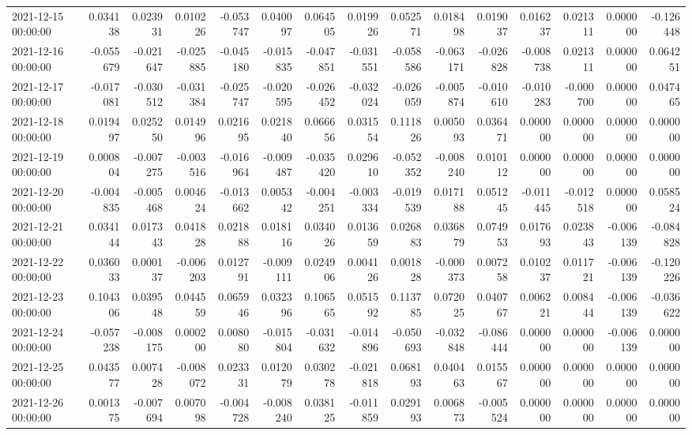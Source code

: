 \begin{tabular}{lrrrrrrrrrrrrrr}
2021-12-15 00:00:00 & 0.034138 & 0.023931 & 0.010226 & -0.053747 & 0.040097 & 0.064505 & 0.019926 & 0.052571 & 0.018498 & 0.019037 & 0.016237 & 0.021311 & 0.000000 & -0.126448 \\
2021-12-16 00:00:00 & -0.055679 & -0.021647 & -0.025885 & -0.045180 & -0.015835 & -0.047851 & -0.031551 & -0.058586 & -0.063171 & -0.026828 & -0.008738 & 0.021311 & 0.000000 & 0.064251 \\
2021-12-17 00:00:00 & -0.017081 & -0.030512 & -0.031384 & -0.025747 & -0.020595 & -0.026452 & -0.032024 & -0.026059 & -0.005874 & -0.010610 & -0.010283 & -0.000700 & 0.000000 & 0.047465 \\
2021-12-18 00:00:00 & 0.019497 & 0.025250 & 0.014996 & 0.021695 & 0.021840 & 0.066656 & 0.031554 & 0.111826 & 0.005093 & 0.036471 & 0.000000 & 0.000000 & 0.000000 & 0.000000 \\
2021-12-19 00:00:00 & 0.000804 & -0.007275 & -0.003516 & -0.016964 & -0.009487 & -0.035420 & 0.029610 & -0.052352 & -0.008240 & 0.010112 & 0.000000 & 0.000000 & 0.000000 & 0.000000 \\
2021-12-20 00:00:00 & -0.004835 & -0.005468 & 0.004624 & -0.013662 & 0.005342 & -0.004251 & -0.003334 & -0.019539 & 0.017188 & 0.051245 & -0.011445 & -0.012518 & 0.000000 & 0.058524 \\
2021-12-21 00:00:00 & 0.034144 & 0.017343 & 0.041828 & 0.021888 & 0.018116 & 0.034026 & 0.013659 & 0.026883 & 0.036879 & 0.074953 & 0.017693 & 0.023843 & -0.006139 & -0.084828 \\
2021-12-22 00:00:00 & 0.036033 & 0.000137 & -0.006203 & 0.012791 & -0.009111 & 0.024906 & 0.004126 & 0.001828 & -0.000373 & 0.007258 & 0.010237 & 0.011721 & -0.006139 & -0.120226 \\
2021-12-23 00:00:00 & 0.104306 & 0.039548 & 0.044559 & 0.065946 & 0.032396 & 0.106565 & 0.051592 & 0.113785 & 0.072025 & 0.040767 & 0.006221 & 0.008444 & -0.006139 & -0.036622 \\
2021-12-24 00:00:00 & -0.057238 & -0.008175 & 0.000200 & 0.008080 & -0.015804 & -0.031632 & -0.014896 & -0.050693 & -0.032848 & -0.086444 & 0.000000 & 0.000000 & -0.006139 & 0.000000 \\
2021-12-25 00:00:00 & 0.043577 & 0.007428 & -0.008072 & 0.023331 & 0.012079 & 0.030278 & -0.021818 & 0.068193 & 0.040463 & 0.015567 & 0.000000 & 0.000000 & 0.000000 & 0.000000 \\
2021-12-26 00:00:00 & 0.001375 & -0.007694 & 0.007098 & -0.004728 & -0.008240 & 0.038125 & -0.011859 & 0.029193 & 0.006873 & -0.005524 & 0.000000 & 0.000000 & 0.000000 & 0.000000 \\

\end{tabular}
